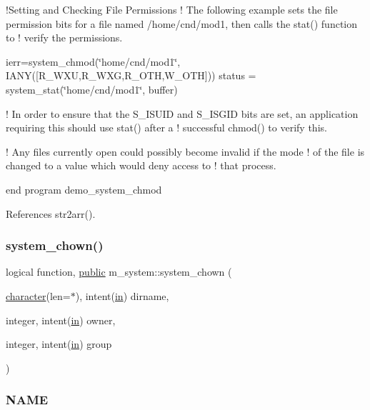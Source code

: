!\+Setting and Checking File Permissions ! The following example sets the file permission bits for a file named /home/cnd/mod1, then calls the stat() function to ! verify the permissions.

ierr=system\+\_\+chmod(\char`\"{}home/cnd/mod1\char`\"{}, I\+A\+N\+Y(\mbox{[}\+R\+\_\+\+W\+X\+U,\+R\+\_\+\+W\+X\+G,\+R\+\_\+\+O\+T\+H,\+W\+\_\+\+O\+T\+H\mbox{]})) status = system\+\_\+stat(\char`\"{}home/cnd/mod1\char`\"{}, buffer)

! In order to ensure that the S\+\_\+\+I\+S\+U\+ID and S\+\_\+\+I\+S\+G\+ID bits are set, an application requiring this should use stat() after a ! successful chmod() to verify this.

! Any files currently open could possibly become invalid if the mode ! of the file is changed to a value which would deny access to ! that process.

end program demo\+\_\+system\+\_\+chmod 

References str2arr().

\mbox{\label{namespacem__system_a3353c1cff032fcfe2985a69f10038ddd}} 
\subsubsection{\texorpdfstring{system\+\_\+chown()}{system\_chown()}}
{\footnotesize\ttfamily logical function, \hyperlink{M__stopwatch_83_8txt_a2f74811300c361e53b430611a7d1769f}{public} m\+\_\+system\+::system\+\_\+chown (\begin{DoxyParamCaption}\item[{\hyperlink{option__stopwatch_83_8txt_abd4b21fbbd175834027b5224bfe97e66}{character}(len=$\ast$), intent(\hyperlink{M__journal_83_8txt_afce72651d1eed785a2132bee863b2f38}{in})}]{dirname,  }\item[{integer, intent(\hyperlink{M__journal_83_8txt_afce72651d1eed785a2132bee863b2f38}{in})}]{owner,  }\item[{integer, intent(\hyperlink{M__journal_83_8txt_afce72651d1eed785a2132bee863b2f38}{in})}]{group }\end{DoxyParamCaption})}



\subsubsection*{N\+A\+ME}

